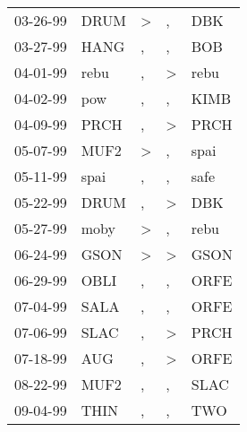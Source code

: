 \begin{supertabular}{p{0.07\textwidth}p{0.06\textwidth}p{0.02\textwidth}p{0.02\textwidth}p{0.06\textwidth}}
 03-26-99\textsuperscript{} &  DRUM\textsuperscript{} &  \textgreater &             , &   DBK\textsuperscript{} \\
 03-27-99\textsuperscript{} &  HANG\textsuperscript{} &             , &             , &   BOB\textsuperscript{} \\
 04-01-99\textsuperscript{} &  rebu\textsuperscript{} &             , &  \textgreater &  rebu\textsuperscript{} \\
 04-02-99\textsuperscript{} &   pow\textsuperscript{} &             , &             , &  KIMB\textsuperscript{} \\
 04-09-99\textsuperscript{} &  PRCH\textsuperscript{} &             , &  \textgreater &  PRCH\textsuperscript{} \\
 05-07-99\textsuperscript{} &  MUF2\textsuperscript{} &  \textgreater &             , &  spai\textsuperscript{} \\
 05-11-99\textsuperscript{} &  spai\textsuperscript{} &             , &             , &  safe\textsuperscript{} \\
 05-22-99\textsuperscript{} &  DRUM\textsuperscript{} &             , &  \textgreater &   DBK\textsuperscript{} \\
 05-27-99\textsuperscript{} &  moby\textsuperscript{} &  \textgreater &             , &  rebu\textsuperscript{} \\
 06-24-99\textsuperscript{} &  GSON\textsuperscript{} &  \textgreater &  \textgreater &  GSON\textsuperscript{} \\
 06-29-99\textsuperscript{} &  OBLI\textsuperscript{} &             , &             , &  ORFE\textsuperscript{} \\
 07-04-99\textsuperscript{} &  SALA\textsuperscript{} &             , &             , &  ORFE\textsuperscript{} \\
 07-06-99\textsuperscript{} &  SLAC\textsuperscript{} &             , &  \textgreater &  PRCH\textsuperscript{} \\
 07-18-99\textsuperscript{} &   AUG\textsuperscript{} &             , &  \textgreater &  ORFE\textsuperscript{} \\
 08-22-99\textsuperscript{} &  MUF2\textsuperscript{} &             , &             , &  SLAC\textsuperscript{} \\
 09-04-99\textsuperscript{} &  THIN\textsuperscript{} &             , &             , &   TWO\textsuperscript{} \\

\end{supertabular}
